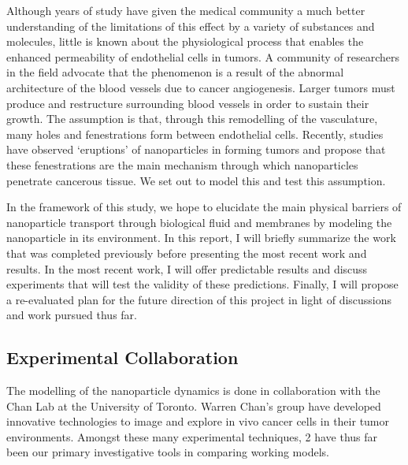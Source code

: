 Although years of study have given the medical community a much better understanding of the limitations of this effect by a variety of substances and molecules, little is known about the physiological process that enables the enhanced permeability of endothelial cells in tumors.
A community of researchers in the field advocate that the phenomenon is a result of the abnormal architecture of the blood vessels due to cancer angiogenesis\cite{Danhier2010}.
Larger tumors must produce and restructure surrounding blood vessels in order to sustain their growth\cite{Bergers2003}.
The assumption is that, through this remodelling of the vasculature, many holes and fenestrations form between endothelial cells.
Recently, studies have observed `eruptions' of nanoparticles in forming tumors and propose that these fenestrations are the main mechanism through which nanoparticles penetrate cancerous tissue\cite{Matsumoto2016}.
We set out to model this and test this assumption.

In the framework of this study, we hope to elucidate the main physical barriers of nanoparticle transport through biological fluid and membranes by modeling the nanoparticle in its environment.
In this report, I will briefly summarize the work that was completed previously before presenting the most recent work and results.
In the most recent work, I will offer predictable results and discuss experiments that will test the validity of these predictions.
Finally, I will propose a re-evaluated plan for the future direction of this project in light of discussions and work pursued thus far.

\subsection{Experimental Collaboration}

The modelling of the nanoparticle dynamics is done in collaboration with the Chan Lab at the University of Toronto.
Warren Chan's group have developed innovative technologies to image and explore in vivo cancer cells in their tumor environments\cite{Syed2017}.
Amongst these many experimental techniques, 2 have thus far been our primary investigative tools in comparing working models.

